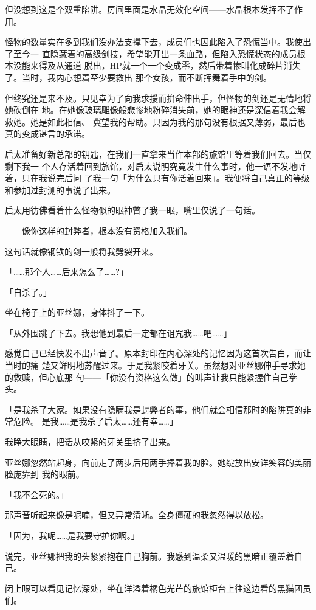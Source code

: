 \documentclass[11pt]{book}
\begin{document}
但没想到这是个双重陷阱。房间里面是水晶无效化空间——水晶根本发挥不了作用。

怪物的数量实在多到我们没办法支撑下去，成员们也因此陷入了恐慌当中。我使出了至今一
直隐藏着的高级剑技，希望能开出一条血路，但陷入恐慌状态的成员根本没能来得及从通道
脱出，HP就一个一个变成零，然后带着惨叫化成碎片消失了。当时，我内心想着至少要救出
那个女孩，而不断挥舞着手中的剑。

但终究还是来不及。只见幸为了向我求援而拚命伸出手，但怪物的剑还是无情地将她砍倒在
地。在她像玻璃雕像般悲惨地粉碎消失前，她的眼神还是深信着我会解救她。她是如此相信、
冀望我的帮助。只因为我的那句没有根据又薄弱，最后也真的变成谌言的承诺。

启太准备好新总部的钥匙，在我们一直拿来当作本部的旅馆里等着我们回去。当仅剩下我一
个人存活着回到旅馆，对启太说明究竟发生什么事时，他一语不发地听着，只在我说完后问
了我一句「为什么只有你活着回来」。我便将自己真正的等级和参加过封测的事说了出来。

启太用彷佛看着什么怪物似的眼神瞥了我一眼，嘴里仅说了一句话。

——像你这样的封弊者，根本没有资格加入我们。

这句话就像钢铁的剑一般将我劈裂开来。

「……那个人……后来怎么了……?」

「自杀了。」

坐在椅子上的亚丝娜，身体抖了一下。

「从外围跳了下去。我想他到最后一定都在诅咒我……吧……」

感觉自己已经快发不出声音了。原本封印在内心深处的记忆因为这首次告白，而让当时的痛
楚又鲜明地苏醒过来。于是我紧咬着牙关。虽然想对亚丝娜伸手寻求她的救赎，但心底那
句——「你没有资格这么做」的叫声让我只能紧握住自己拳头。

「是我杀了大家。如果没有隐瞒我是封弊者的事，他们就会相信那时的陷阱真的非常危险。
是我……是我杀了启太……还有幸……」

我睁大眼睛，把话从咬紧的牙关里挤了出来。

亚丝娜忽然站起身，向前走了两步后用两手捧着我的脸。她绽放出安详笑容的美丽脸庞靠到
我的眼前。

「我不会死的。」

那声音听起来像是呢喃，但又异常清晰。全身僵硬的我忽然得以放松。

「因为，我呢……是我要守护你啊。」

说完，亚丝娜把我的头紧紧抱在自己胸前。我感到温柔又温暖的黑暗正覆盖着自己。

闭上眼可以看见记忆深处，坐在洋溢着橘色光芒的旅馆柜台上往这边看的黑猫团员们。
\end{document}
